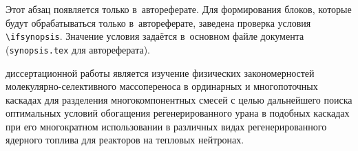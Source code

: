 \ifsynopsis
Этот абзац появляется только в~автореферате.
Для формирования блоков, которые будут обрабатываться только в~автореферате,
заведена проверка условия \verb!\!\verb!ifsynopsis!.
Значение условия задаётся в~основном файле документа (\verb!synopsis.tex! для
автореферата).
\else
\fi


{\aim} диссертационной работы является изучение физических закономерностей
молекулярно-селективного массопереноса в ординарных и многопоточных каскадах
для разделения многокомпонентных смесей с целью дальнейшего поиска
оптимальных условий обогащения регенерированного урана в подобных каскадах при
его многократном использовании в различных видах регенерированного ядерного
топлива для реакторов на тепловых нейтронах.

